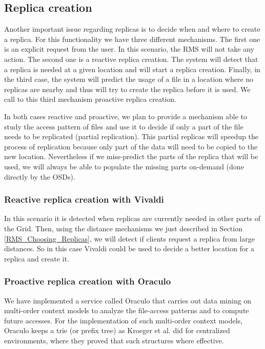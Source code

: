 \subsection{Replica creation}
\label{RMS_Replica_Creation}

Another important issue regarding replicas is to decide when and where to create
a replica. For this functionality we have three different mechanisms. The first
one is an explicit request from the user. In this scenario, the RMS will not
take any action. The second one is a reactive replica creation. The system will
detect that a replica is needed at a given location and will start a replica
creation. Finally, in the third case, the system will predict the usage of a
file in a location where no replicas are nearby and thus will try to create the
replica before it is used. We call to this third mechanism proactive replica
creation.

In both cases reactive and proactive, we plan to provide a mechanism able to
study the access pattern of files and use it to decide if only a part of the
file needs to be replicated (partial replication). This partial replicas will
speedup the process of replication because only part of the data will need to be
copied to the new location. Nevertheless if we miss-predict the parts of the
replica that will be used, we will always be able to populate the missing parts
on-demand (done directly by the OSDs).

\subsubsection{Reactive replica creation with Vivaldi} 

In this scenario it is detected when replicas are currently needed in other
parts of the Grid. Then, using the distance mechanisms we just described in
Section \ref{RMS_Choosing_Replicas}, we will detect if clients request a replica
from large distances. So in this case Vivaldi could be used to decide a better
location for a replica and create it.

\subsubsection{Proactive replica creation with Oraculo}

We have implemented a service called Oraculo that carries out data mining on
multi-order context models to analyze the file-access patterns and to compute
future accesses. For the implementation of such multi-order context models,
Oraculo keeps a trie (or prefix tree) as Kroeger et al. did \cite{kroeger1996pfs,
kroeger2001dai} for centralized environments, where they proved that such structures
where effective. 

